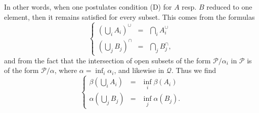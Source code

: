 In other words, when one postulates condition (D) for $A$ resp. $B$ reduced to one element, then it remains satisfied for every subset. This comes from the formulas
\[
\left\{
\begin{array}{lcl}
(\bigcup_i A_i)^\cup & = & \bigcap_i A_i^\cup \\[1ex]
(\bigcup_j B_j)^\cap & = & \bigcap_j B_j^\cap,
\end{array}
\right.
\tag*{(5.2)}
\]
and from the fact that the intersection of open subsets of the form $\mathcal{P}/\alpha_i$ in $\mathcal{P}$ is of the form $\mathcal{P}/\alpha$, where $\alpha = \inf_i \alpha_i$, and likewise in $\mathcal{Q}$. Thus we find
\[
\left\{
\begin{array}{lcl}
\beta(\bigcup_i A_i) & = & \inf_i \beta(A_i) \\[1ex]
\alpha(\bigcup_j B_j) & = & \inf_j \alpha(B_j).
\end{array}
\right.
\tag*{(5.3)}
\]